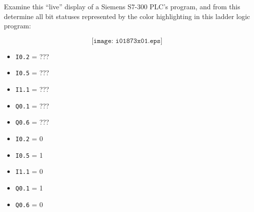

Examine this ``live'' display of a Siemens S7-300 PLC's program, and from this determine all bit statuses represented by the color highlighting in this ladder logic program:

$$\texttt{[image: i01873x01.eps]}$$

\begin{itemize}
\item{} {\tt I0.2} = ???
\vskip 10pt
\item{} {\tt I0.5} = ???
\vskip 10pt
\item{} {\tt I1.1} = ???
\vskip 10pt
\item{} {\tt Q0.1} = ???
\vskip 10pt
\item{} {\tt Q0.6} = ???
\end{itemize}







\begin{itemize}
\item{} {\tt I0.2} = 0
\item{} {\tt I0.5} = 1
\item{} {\tt I1.1} = 0
\item{} {\tt Q0.1} = 1
\item{} {\tt Q0.6} = 0
\end{itemize}











